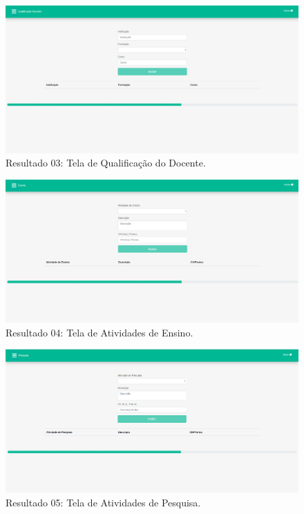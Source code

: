\begin{figure}[htb]
    \centering
    \includegraphics[width=.8\textwidth]{img/pagina_qualificacao_docente.PNG}
    \caption[Resultado 03: Tela de Qualificação do Docente]{Resultado 03: Tela de Qualificação do Docente.}
    \label{fig:result03}
\end{figure}

\begin{figure}[htb]
    \centering
    \includegraphics[width=.8\textwidth]{img/pagina_ensino.PNG}
    \caption[Resultado 04: Tela de Atividades de Ensino]{Resultado 04: Tela de Atividades de Ensino.}
    \label{fig:result04}
\end{figure}

\begin{figure}[htb]
    \centering
    \includegraphics[width=.8\textwidth]{img/pagina_pesquisa.PNG}
    \caption[Resultado 05: Tela de Atividades de Pesquisa]{Resultado 05: Tela de Atividades de Pesquisa.}
    \label{fig:result05}
\end{figure}

